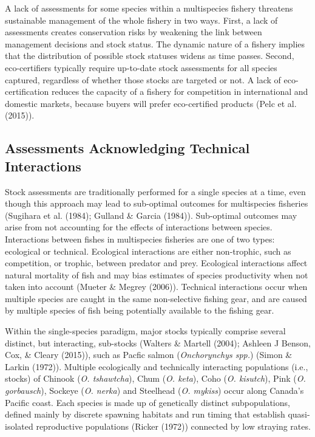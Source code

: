 \documentclass[12pt,]{scrartcl}
\begin{document}
A lack of assessments for some species within a multispecies fishery
threatens sustainable management of the whole fishery in two ways.
First, a lack of assessments creates conservation risks by weakening the
link between management decisions and stock status. The dynamic nature
of a fishery implies that the distribution of possible stock statuses
widens as time passes. Second, eco-certifiers typically require
up-to-date stock assessments for all species captured, regardless of
whether those stocks are targeted or not. A lack of eco-certification
reduces the capacity of a fishery for competition in international and
domestic markets, because buyers will prefer eco-certified products
(Pelc et al. (2015)).

\subsection{Assessments Acknowledging Technical
Interactions}\label{assessments-acknowledging-technical-interactions}

Stock assessments are traditionally performed for a single species at a
time, even though this approach may lead to sub-optimal outcomes for
multispecies fisheries (Sugihara et al. (1984); Gulland \& Garcia
(1984)). Sub-optimal outcomes may arise from not accounting for the
effects of interactions between species. Interactions between fishes in
multispecies fisheries are one of two types: ecological or technical.
Ecological interactions are either non-trophic, such as competition, or
trophic, between predator and prey. Ecological interactions affect
natural mortality of fish and may bias estimates of species productivity
when not taken into account (Mueter \& Megrey (2006)). Technical
interactions occur when multiple species are caught in the same
non-selective fishing gear, and are caused by multiple species of fish
being potentially available to the fishing gear.

Within the single-species paradigm, major stocks typically comprise
several distinct, but interacting, sub-stocks (Walters \& Martell
(2004); Ashleen J Benson, Cox, \& Cleary (2015)), such as Pacfic salmon
(\emph{Onchorynchys spp.}) (Simon \& Larkin (1972)). Multiple
ecologically and technically interacting populations (i.e., stocks) of
Chinook (\emph{O. tshawtcha}), Chum (\emph{O. keta}), Coho (\emph{O.
kisutch}), Pink (\emph{O. gorbausch}), Sockeye (\emph{O. nerka}) and
Steelhead (\emph{O. mykiss}) occur along Canada's Pacific coast. Each
species is made up of genetically distinct subpopulations, defined
mainly by discrete spawning habitats and run timing that establish
quasi-isolated reproductive populations (Ricker (1972)) connected by low
straying rates.
\end{document}
